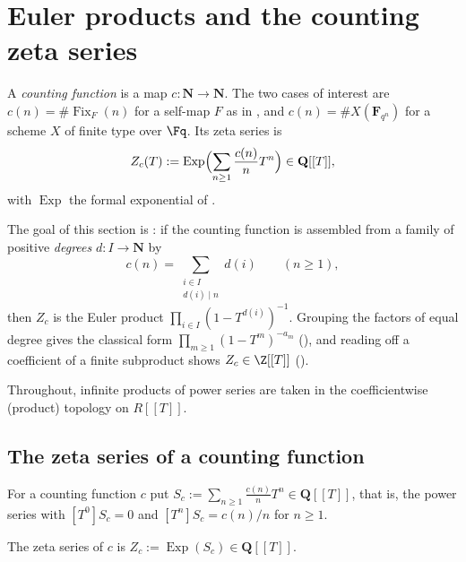 
\section{Euler products and the counting zeta series}
\label{sec:weil-counting-euler-product}

A \emph{counting function} is a map $c\colon\mathbf N\to\mathbf N$.  The two
cases of interest are $c(n)=\#\operatorname{Fix}_F(n)$ for a self-map $F$ as in
, and $c(n)=\#X(\mathbf F_{q^n})$ for a scheme $X$
of finite type over $\Fq$.  Its zeta series is
\[
  Z_c(T):=\operatorname{Exp}\Bigl(\sum_{n\ge 1}\frac{c(n)}{n}T^n\Bigr)
  \in\mathbf Q[[T]],
\]
with $\operatorname{Exp}$ the formal exponential of
.

The goal of this section is : if the
counting function is assembled from a family of positive \emph{degrees}
$d\colon I\to\mathbf N$ by
\[
  c(n)=\sum_{\substack{i\in I\\ d(i)\mid n}}d(i)\qquad(n\ge 1),
\]
then $Z_c$ is the Euler product $\prod_{i\in I}(1-T^{d(i)})^{-1}$.  Grouping the
factors of equal degree gives the classical form
$\prod_{m\ge 1}(1-T^m)^{-a_m}$ (),
and reading off a coefficient of a finite subproduct shows $Z_c\in\Z[[T]]$
().

Throughout, infinite products of power series are taken in the coefficientwise
(product) topology on $R[[T]]$.

\subsection{The zeta series of a counting function}

\begin{definition}
  \label{def:weil-counting-log-series}
  \leanok

  For a counting function $c$ put
  $S_c:=\sum_{n\ge 1}\frac{c(n)}{n}T^n\in\mathbf Q[[T]]$, that is, the power
  series with $[T^0]S_c=0$ and $[T^n]S_c=c(n)/n$ for $n\ge 1$.
\end{definition}

\begin{definition}
  \label{def:weil-counting-zeta-series}
  \leanok

  The zeta series of $c$ is $Z_c:=\operatorname{Exp}(S_c)\in\mathbf Q[[T]]$.
\end{definition}

